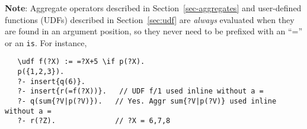 \noindent
\textbf{Note}:  Aggregate operators described in
Section~\ref{sec-aggregates} and user-defined functions (UDFs) described in
Section~\ref{sec:udf} are \emph{always} evaluated when they are found in an
argument position, so they never need to be prefixed with an ``='' or an
\texttt{\bs{}is}. For instance,
\begin{verbatim}
   \udf f(?X) := =?X+5 \if p(?X).
   p({1,2,3}).
   ?- insert{q(6)}.
   ?- insert{r(=f(?X))}.   // UDF f/1 used inline without a =
   ?- q(sum{?V|p(?V)}).   // Yes. Aggr sum{?V|p(?V)} used inline without a =
   ?- r(?Z).              // ?X = 6,7,8
\end{verbatim}

